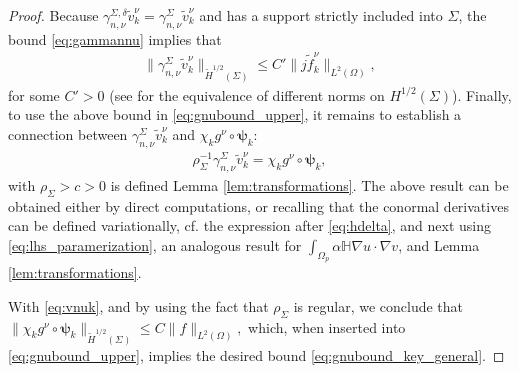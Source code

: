 \documentclass[report]{elsarticle}
\numberwithin{theorem}{section}
\newcommand{\bpsi}{\boldsymbol{\psi}}
\begin{document}
\begin{proof}
Because  $\gamma_{n,\nu}^{\Sigma,\delta}\widetilde{v}_k^{\nu}=\gamma_{n,\nu}^{\Sigma}\widetilde{v}_k^{\nu}$ and has a  support strictly included into $\Sigma$, the bound \eqref{eq:gammannu} implies that 
\begin{align}
	\label{eq:vnuk}
	\|\gamma_{n,\nu}^{\Sigma}\widetilde{v}_k^{\nu}\|_{\widetilde{H}^{1/2}(\Sigma)}\leq C'\|j\widetilde{f}^{\nu}_k\|_{L^2(\Omega)},
\end{align}
for some $C'>0$ (see \cite[Theorem 4.2.1]{wendland_hsiao} for the equivalence of different norms on $H^{1/2}(\Sigma)$).
%
%	
Finally, to use the above bound in \eqref{eq:gnubound_upper}, it remains to establish a connection between $\gamma_{n,\nu}^{\Sigma}\widetilde{v}_k^{\nu}$ and $\chi_kg^{\nu}\circ \bpsi_k$:
\begin{align*}
\rho^{-1}_{\Sigma}\gamma_{n,\nu}^{\Sigma}\widetilde{v}_k^{\nu}=\chi_kg^{\nu}\circ \bpsi_k,
\end{align*}
with $\rho_{\Sigma}>c>0$ is defined Lemma \ref{lem:transformations}. The above result can be obtained either by direct computations, or recalling that the conormal derivatives can be defined variationally, cf. the expression after \eqref{eq:hdelta}, and next using \eqref{eq:lhs_paramerization}, an analogous result for $\int_{\Omega_p}\alpha\mathbb{H}\nabla u\cdot \nabla v$, and Lemma \ref{lem:transformations}.

With \eqref{eq:vnuk}, and by using the fact that $\rho_{\Sigma}$ is regular, we conclude that 
$
	\|\chi_k g^{\nu}\circ \bpsi_k\|_{\widetilde{H}^{1/2}(\Sigma)}\leq C\|f\|_{L^2(\Omega)},$
which, when inserted into \eqref{eq:gnubound_upper},  implies the desired bound \eqref{eq:gnubound_key_general}.
\end{proof}
\end{document}
